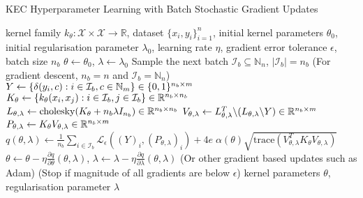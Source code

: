 \documentclass{article}
\begin{document}
	\begin{algorithm}[tb]
		\caption{KEC Hyperparameter Learning with Batch Stochastic Gradient Updates}
		\label{alg:kernel_embedding_classifier_training}
		\begin{algorithmic}[1]
			 kernel family $k_{\theta} : \mathcal{X} \times \mathcal{X} \to \mathbb{R}$, dataset $\{x_{i}, y_{i}\}_{i = 1}^{n}$, initial kernel parameters $\theta_{0}$, initial regularisation parameter $\lambda_{0}$, learning rate $\eta$, gradient error tolerance $\epsilon$, batch size $n_{b}$
			\STATE $\theta \leftarrow \theta_{0}$, $\lambda \leftarrow \lambda_{0}$
			\REPEAT
			\STATE Sample the next batch $\mathcal{I}_{b} \subseteq \mathbb{N}_{n}$, $| \mathcal{I}_{b} | = n_{b}$ \hspace{\fill} (For gradient descent, $n_{b} = n$ and $\mathcal{I}_{b} = \mathbb{N}_{n}$)
			\STATE $Y \leftarrow \{\delta(y_{i}, c) : i \in \mathcal{I}_{b}, c \in \mathbb{N}_{m}\} \hspace{\fill} \in \{0, 1\}^{n_{b} \times m}$
			\STATE $K_{\theta} \leftarrow \{k_{\theta}(x_{i}, x_{j}) : i \in \mathcal{I}_{b}, j \in \mathcal{I}_{b}\} \hspace{\fill} \in \mathbb{R}^{n_{b} \times n_{b}}$
			\STATE $L_{\theta, \lambda} \leftarrow \mathrm{cholesky}(K_{\theta} + n_{b} \lambda I_{n_{b}}) \hspace{\fill} \in \mathbb{R}^{n_{b} \times n_{b}}$
			\STATE $V_{\theta, \lambda} \leftarrow L_{\theta, \lambda}^{T} \backslash (L_{\theta, \lambda} \backslash Y) \hspace{\fill} \in \mathbb{R}^{n_{b} \times m}$
			\STATE $P_{\theta, \lambda} \leftarrow K_{\theta} V_{\theta, \lambda} \hspace{\fill} \in \mathbb{R}^{n_{b} \times m}$
			\STATE $q(\theta, \lambda) \leftarrow \frac{1}{n_{b}} \sum_{i \in \mathcal{I}_{b}} \mathcal{L}_{\epsilon}((Y)_{i}, (P_{\theta, \lambda})_{i}) + 4 e \; \alpha(\theta) \sqrt{\mathrm{trace}(V_{\theta, \lambda}^{T} K_{\theta} V_{\theta, \lambda})}$
			\STATE $\theta \leftarrow \theta - \eta \frac{\partial q}{\partial \theta}(\theta, \lambda)$, $\lambda \leftarrow \lambda - \eta \frac{\partial q}{\partial \lambda}(\theta, \lambda)$ \hspace{\fill} (Or other gradient based updates such as Adam)
			 \hspace{\fill} (Stop if magnitude of all gradients are below $\epsilon$)
			 kernel parameters $\theta$, regularisation parameter $\lambda$
		\end{algorithmic}
	\end{algorithm}
\end{document}
